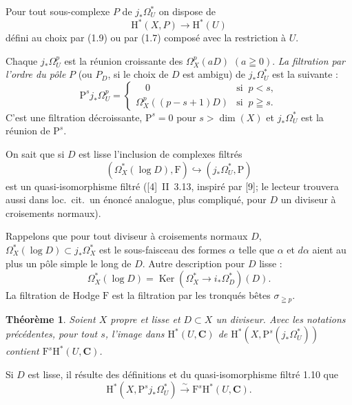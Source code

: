 \documentclass[12pt,a4paper]{article}
\theoremstyle{plain}
\newtheorem{theorem}{Théorème}
\theoremstyle{definition}
\DeclareMathOperator{\Ker}{Ker}
\begin{document}
Pour tout sous-complexe $P$ de $j_* \Omega_U^*$ on dispose de
\[
\mathrm{H}^*(X, P) \to \mathrm{H}^*(U)
\]
défini au choix par (1.9) ou par (1.7) composé avec la restriction à $U$.

Chaque $j_* \Omega_U^p$ est la réunion croissante des $\Omega_X^p(aD)$ $(a \geqq 0)$. \textit{La filtration par l'ordre du pôle} $P$ (ou $P_D$, si le choix de $D$ est ambigu) de $j_* \Omega_U^*$ est la suivante :
\[
\mathrm{P}^s j_* \Omega_U^p =
\begin{cases}
\quad 0 & \text{si }\ p < s, \\[4pt]
\Omega_X^p((p-s+1)D) & \text{si }\ p \geqq s.
\end{cases}
\]
C'est une filtration décroissante, $\mathrm{P}^s = 0$ pour $s > \dim(X)$ et $j_* \Omega_U^*$ est la réunion de $\mathrm{P}^s$.

On sait que si $D$ est lisse l'inclusion de complexes filtrés
\begin{equation}\label{eq:1.10}
(\Omega_X^*(\log D), \mathrm{F}) \hookrightarrow (j_* \Omega_U^*, \mathrm{P})
\tag{1.10}
\end{equation}
est un quasi-isomorphisme filtré ([4]~II~3.13, inspiré par [9]; le lecteur trouvera aussi dans loc.\ cit.\ un énoncé analogue, plus compliqué, pour $D$ un diviseur à croisements normaux).

Rappelons que pour tout diviseur à croisements normaux $D$, $\Omega_X^*(\log D) \subset j_* \Omega_X^*$ est le sous-faisceau des formes $\alpha$ telle que $\alpha$ et $d\alpha$ aient au plus un pôle simple le long de $D$. Autre description pour $D$ lisse :
\[
\Omega_X^*(\log D) = \Ker(\Omega_X^* \to i_* \Omega_D^*)(D).
\]
La filtration de Hodge $\mathrm{F}$ est la filtration par les tronqués bêtes $\sigma_{\geqq p}$.

\begin{theorem}
Soient $X$ propre et lisse et $D \subset X$ un diviseur. Avec les notations précédentes, pour tout $s$, l'image dans $\mathrm{H}^*(U, \mathbf{C})$ de $\mathrm{H}^*(X, \mathrm{P}^s(j_* \Omega_U^*))$ contient $\mathrm{F}^s \mathrm{H}^*(U, \mathbf{C})$.
\end{theorem}

Si $D$ est lisse, il résulte des définitions et du quasi-isomorphisme filtré 1.10 que
\[
\mathrm{H}^*(X, \mathrm{P}^s j_* \Omega_U^*) \xrightarrow{\;\sim\;} \mathrm{F}^s \mathrm{H}^*(U, \mathbf{C}).
\]
\end{document}
